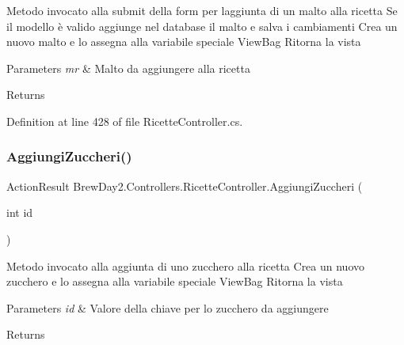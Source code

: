 Metodo invocato alla submit della form per l\textquotesingle{}aggiunta di un malto alla ricetta Se il modello è valido aggiunge nel database il malto e salva i cambiamenti Crea un nuovo malto e lo assegna alla variabile speciale View\+Bag Ritorna la vista 


\begin{DoxyParams}{Parameters}
{\em mr} & Malto da aggiungere alla ricetta\\
\hline
\end{DoxyParams}
\begin{DoxyReturn}{Returns}

\end{DoxyReturn}


Definition at line 428 of file Ricette\+Controller.\+cs.

\mbox{\label{class_brew_day2_1_1_controllers_1_1_ricette_controller_a2f15ba984d68bd7b37f4e36ddd5447dc}} 
\subsubsection{\texorpdfstring{Aggiungi\+Zuccheri()}{AggiungiZuccheri()}\hspace{0.1cm}{\footnotesize\ttfamily [1/2]}}
{\footnotesize\ttfamily Action\+Result Brew\+Day2.\+Controllers.\+Ricette\+Controller.\+Aggiungi\+Zuccheri (\begin{DoxyParamCaption}\item[{int}]{id }\end{DoxyParamCaption})}



Metodo invocato alla aggiunta di uno zucchero alla ricetta Crea un nuovo zucchero e lo assegna alla variabile speciale View\+Bag Ritorna la vista 


\begin{DoxyParams}{Parameters}
{\em id} & Valore della chiave per lo zucchero da aggiungere\\
\hline
\end{DoxyParams}
\begin{DoxyReturn}{Returns}

\end{DoxyReturn}


